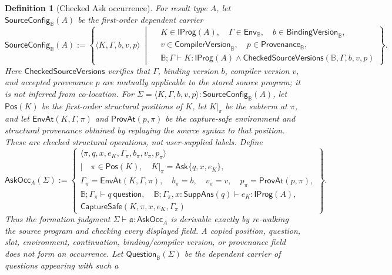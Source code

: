 \documentclass[11pt,oneside]{article}
\newtheorem{definition}{Definition}[section]
\newcommand{\B}{\mathbb B}
\newcommand{\AskRef}{\mathfrak a}
\begin{document}
\begin{definition}[Checked Ask occurrence]\label{def:ask-occurrence}
For result type \(A\), let \(\mathsf{SourceConfig}_{\B}(A)\) be the first-order dependent carrier
\[
\boxed{
\mathsf{SourceConfig}_{\B}(A)
:=
\left\{
\langle K,\Gamma,b,v,p\rangle
\ \middle|\
\begin{aligned}
&K\in\mathsf{IProg}(A),\quad
 \Gamma\in\mathsf{Env}_{\B},\quad
 b\in\mathsf{BindingVersion}_{\B},\\
&v\in\mathsf{CompilerVersion}_{\B},\quad
 p\in\mathsf{Provenance}_{\B},\\
&\B;\Gamma\vdash K:\mathsf{IProg}(A)
 \land\mathsf{CheckedSourceVersions}(\B,\Gamma,b,v,p)
\end{aligned}
\right\}.
}
\]
Here \(\mathsf{CheckedSourceVersions}\) verifies that \(\Gamma\), binding version \(b\), compiler
version \(v\), and accepted provenance \(p\) are mutually applicable to the stored source program;
it is not inferred from co-location.
For \(\Sigma=\langle K,\Gamma,b,v,p\rangle:\mathsf{SourceConfig}_{\B}(A)\), let
\(\mathsf{Pos}(K)\) be the first-order structural positions of \(K\), let
\(K|_\pi\) be the subterm at \(\pi\), and let
\(\mathsf{EnvAt}(K,\Gamma,\pi)\) and \(\mathsf{ProvAt}(p,\pi)\) be the capture-safe environment and
structural provenance obtained by replaying the source syntax to that position.  These are checked
structural operations, not user-supplied labels.  Define
\[
\boxed{
\mathsf{AskOcc}_A(\Sigma)
:=
\left\{
\begin{gathered}
\langle\pi,q,x,e_K,\Gamma_\pi,b_\pi,v_\pi,p_\pi\rangle
\\[-1mm]
\mathrel{\Big|}\quad
\pi\in\mathsf{Pos}(K),\quad
 K|_\pi=\mathsf{Ask}\{q,x,e_K\},\\
\Gamma_\pi=\mathsf{EnvAt}(K,\Gamma,\pi),\quad
 b_\pi=b,\quad v_\pi=v,\quad p_\pi=\mathsf{ProvAt}(p,\pi),\\
\B;\Gamma_\pi\vdash q\ \mathsf{question},\quad
\B;\Gamma_\pi,x:\mathsf{SuppAns}(q)\vdash e_K:\mathsf{IProg}(A),\\
\mathsf{CaptureSafe}(K,\pi,x,e_K,\Gamma_\pi)
\end{gathered}
\right\}.
}
\]
Thus the formation judgment
\(\Sigma\vdash\AskRef:\mathsf{AskOcc}_A\) is derivable exactly by re-walking the source program
and checking every displayed field.  A copied position, question, slot, environment, continuation,
binding/compiler version, or provenance field does not form an occurrence.
Let \(\mathsf{Question}_{\B}(\Sigma)\) be the dependent carrier of questions appearing with such a

\end{definition}
\end{document}
